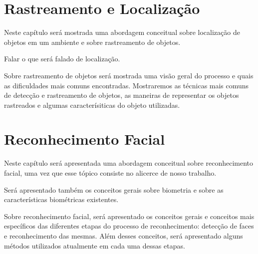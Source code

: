 \chapter{Rastreamento e Localização}

	Neste capítulo será mostrada uma abordagem conceitual sobre localização de objetos em um ambiente e sobre rastreamento de objetos.

	Falar o que será falado de localização.

	Sobre rastreamento de objetos será mostrada uma visão geral do processo e quais as dificuldades mais comuns encontradas. Mostraremos as técnicas mais comuns de detecção e rastreamento de objetos, as maneiras de representar os objetos rastreados e algumas caracterísiticas do objeto utilizadas.

	
	

\chapter{Reconhecimento Facial}

	Neste capítulo será apresentada uma abordagem conceitual sobre reconhecimento facial, uma vez que esse tópico consiste no alicerce de nosso trabalho. 

	Será apresentado também os conceitos gerais sobre biometria e sobre as características biométricas existentes.

	Sobre reconhecimento facial, será apresentado os conceitos gerais e conceitos mais específicos das diferentes etapas do processo de reconhecimento: detecção de faces e reconhecimento das mesmas. Além desses conceitos, será apresentado alguns métodos utilizados atualmente em cada uma dessas etapas.


	
	






























